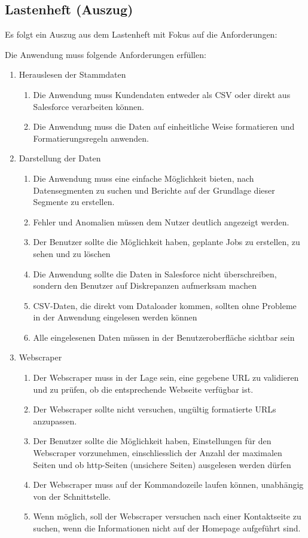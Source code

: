 
\subsection{Lastenheft (Auszug)}
\label{app:Lastenheft}
Es folgt ein Auszug aus dem Lastenheft mit Fokus auf die Anforderungen:

Die Anwendung muss folgende Anforderungen erf\"ullen: 
\begin{enumerate}[itemsep=0em,partopsep=0em,parsep=0em,topsep=0em]
\item Herauslesen der Stammdaten
	\begin{enumerate}
	\item Die Anwendung muss Kundendaten entweder als CSV oder direkt aus Salesforce verarbeiten k\"onnen.
	\item Die Anwendung muss die Daten auf einheitliche Weise formatieren und Formatierungsregeln anwenden.
	\end{enumerate}
\item Darstellung der Daten
	\begin{enumerate}
	\item Die Anwendung muss eine einfache M\"oglichkeit bieten, nach Datensegmenten zu suchen und Berichte auf der Grundlage dieser Segmente zu erstellen.
	\item Fehler und Anomalien m\"ussen dem Nutzer deutlich angezeigt werden.
	\item Der Benutzer sollte die M\"oglichkeit haben, geplante Jobs zu erstellen, zu sehen und zu l\"oschen
	\item Die Anwendung sollte die Daten in Salesforce nicht \"uberschreiben, sondern den Benutzer auf Diskrepanzen aufmerksam machen
	\item CSV-Daten, die direkt vom Dataloader kommen, sollten ohne Probleme in der Anwendung eingelesen werden k\"onnen 
 	\item Alle eingelesenen Daten m\"ussen in der Benutzeroberfl\"ache sichtbar sein
	\end{enumerate}
\item Webscraper
	\begin{enumerate}
	\item Der Webscraper muss in der Lage sein, eine gegebene URL zu validieren und zu pr\"ufen, ob die entsprechende Webseite verf\"ugbar ist.
	\item Der Webscraper sollte nicht versuchen, ung\"ultig formatierte URLs anzupassen.
	\item Der Benutzer sollte die M\"oglichkeit haben, Einstellungen f\"ur den Webscraper vorzunehmen, einschliesslich der Anzahl der maximalen Seiten und ob http-Seiten (unsichere Seiten) ausgelesen werden d\"urfen
	\item Der Webscraper muss auf der Kommandozeile laufen k\"onnen, unabh\"angig von der Schnittstelle.
    \item Wenn m\"oglich, soll der Webscraper versuchen nach einer Kontaktseite zu suchen, wenn die Informationen nicht auf der Homepage aufgef\"uhrt sind.
\end{enumerate}
	

\end{enumerate}
